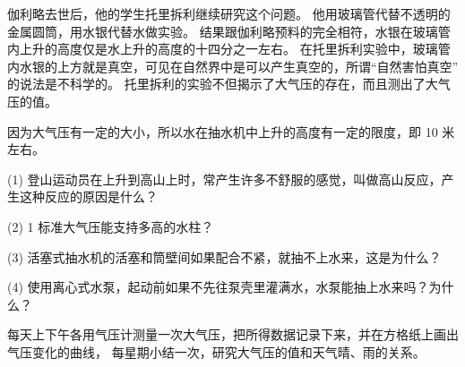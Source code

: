 伽利略去世后，他的学生托里拆利继续研究这个问题。
他用玻璃管代替不透明的金属圆筒，用水银代替水做实验。
结果跟伽利略预料的完全相符，水银在玻璃管内上升的高度仅是水上升的高度的十四分之一左右。
在托里拆利实验中，玻璃管内水银的上方就是真空，可见在自然界中是可以产生真空的，所谓“自然害怕真空” 的说法是不科学的。
托里拆利的实验不但揭示了大气压的存在，而且测出了大气压的值。

因为大气压有一定的大小，所以水在抽水机中上升的高度有一定的限度，即 10 米左右。



\lianxi

(1) 登山运动员在上升到高山上时，常产生许多不舒服的感觉，叫做高山反应，产生这种反应的原因是什么？

(2) 1 标准大气压能支持多高的水柱？

(3) 活塞式抽水机的活塞和筒壁间如果配合不紧，就抽不上水来，这是为什么？

(4) 使用离心式水泵，起动前如果不先往泵壳里灌满水，水泵能抽上水来吗？为什么？




每天上下午各用气压计测量一次大气压，把所得数据记录下来，并在方格纸上画出气压变化的曲线，
每星期小结一次，研究大气压的值和天气晴、雨的关系。

